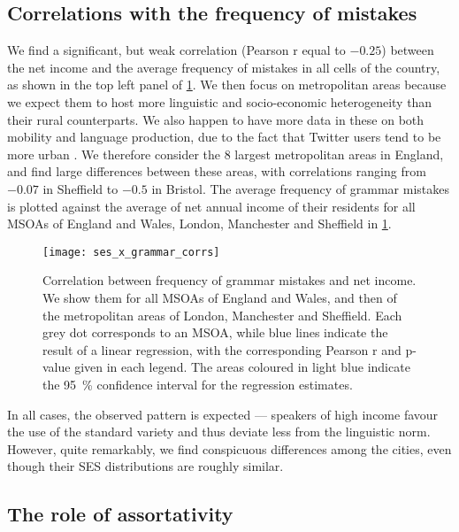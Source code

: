 \documentclass[../thesis.tex]{subfiles}
\begin{document}
\subsection{Correlations with the frequency of mistakes}
We find a significant, but weak correlation (Pearson r equal to $-0.25$) between the net
income and the average frequency of mistakes in all cells of the country, as shown in
the top left panel of \cref{fig:ses_x_grammar_corrs}. We then focus on metropolitan
areas because we expect them to host more linguistic and socio-economic heterogeneity
than their rural counterparts. We also happen to have more data in these on both
mobility and language production, due to the fact that Twitter users tend to be more
urban \cite{MisloveUnderstandingDemographics2011}. We therefore consider the 8 largest
metropolitan areas in England, and find large differences between these areas, with
correlations ranging from $-0.07$ in Sheffield to $-0.5$ in Bristol. The average frequency
of grammar mistakes is plotted against the average of net annual income of their
residents for all \acp{MSOA} of England and Wales, London, Manchester and Sheffield in
\cref{fig:ses_x_grammar_corrs}.
\begin{figure}
\centering
  \texttt{[image: ses\_x\_grammar\_corrs]}
  \caption{ Correlation between frequency of grammar mistakes and net income. We show
  them for all \acp{MSOA} of England and Wales, and then of the metropolitan areas of
  London, Manchester and Sheffield. Each grey dot corresponds to an \ac{MSOA}, while
  blue lines indicate the result of a linear regression, with the corresponding Pearson
  r and p-value given in each legend. The areas coloured in light blue indicate the
  \SI{95}{\percent} confidence interval for the regression estimates.}
  \label{fig:ses_x_grammar_corrs}
\end{figure}
In all cases, the observed pattern is expected --- speakers of high income favour the
use of the standard variety and thus deviate less from the linguistic norm. However,
quite remarkably, we find conspicuous differences among the cities, even though their
\ac{SES} distributions are roughly similar. 


\subsection{The role of assortativity}
\end{document}
